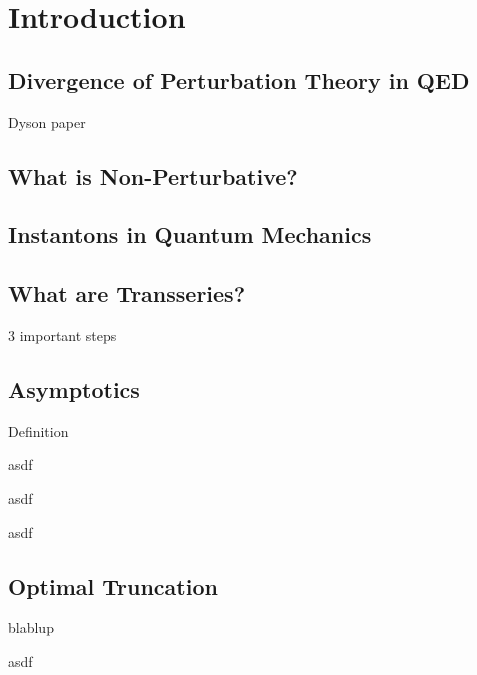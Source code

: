 \chapter{Introduction}
\begin{refsection}
    \nocite{marino_lectures_2014, costin_physical_2020, hatsuda_quasinormal_2020, dorigoni_introduction_2015, aniceto_primer_2019, bender_anharmonic_1969, bender_anharmonic_1973, muller-kirsten_introduction_2012,}

\printbibliography[heading = subbibliography]

\section{Divergence of Perturbation Theory in QED}
Dyson paper~\cite{dyson_divergence_1952}

\section{What is Non-Perturbative?}

\section{Instantons in Quantum Mechanics}

\section{What are Transseries?}
\cite{marino_lectures_2014}

3 important steps

\section{Asymptotics}
Definition

\begin{example}
    asdf
\end{example}

\begin{example}
    asdf
\end{example}

\begin{example}
    asdf
\end{example}

\section{Optimal Truncation}
blablup

\begin{example}
    asdf
\end{example}


\end{refsection}
